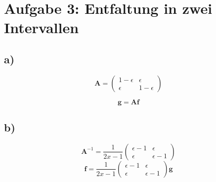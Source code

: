 \section*{Aufgabe 3: Entfaltung in zwei Intervallen}
\label{sec:Aufgabe3}
\subsection*{a)}
\begin{equation}
    \mathbf{A} =\left(\begin{matrix}
                    1 - \epsilon & \epsilon\\
                    \epsilon     & 1 - \epsilon
                 \end{matrix}\right)
\end{equation}

\begin{equation}
    \mathbf{g} = \mathbf{A f}
\end{equation}

\subsection*{b)}
\begin{equation}
    \mathbf{A}^{-1} = \frac{1}{2x-1} \left(\begin{matrix}
                    \epsilon - 1 & \epsilon\\
                    \epsilon     & \epsilon - 1
                 \end{matrix}\right)
\end{equation}
\begin{equation}
    \mathbf{f} = \frac{1}{2x-1} \left(\begin{matrix}
                    \epsilon - 1 & \epsilon\\
                    \epsilon     & \epsilon - 1
                 \end{matrix}\right) \mathbf{g}
\end{equation}